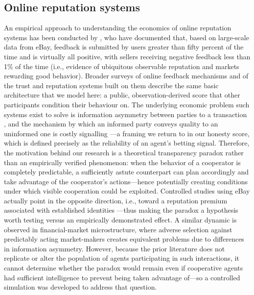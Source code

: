 \documentclass[journal]{IEEEtran}
\begin{document}
\subsection{Online reputation systems}
An empirical approach to understanding the economics of online
reputation systems has been conducted by \citet{resnick2002trust}, who have documented that, based on
large-scale data from eBay, feedback is submitted by users greater
than fifty percent of the time and is virtually all positive, with
sellers receiving negative feedback less than 1\% of the time (i.e.,
evidence of ubiquitous observable reputation and markets rewarding
good behavior). Broader surveys of online feedback mechanisms
\citep{dellarocas2003digitization} and of the trust and reputation
systems built on them \citep{josang2007survey} describe the same
basic architecture that we model here: a public, observation-derived
score that other participants condition their behaviour on. The
underlying economic problem such systems exist to solve is
information asymmetry between parties to a transaction
\citep{akerlof1970market}, and the mechanism by which an informed
party conveys quality to an uninformed one is costly signalling
\citep{spence1973job}---a framing we return to in our honesty score,
which is defined precisely as the reliability of an agent's
betting signal. Therefore, the motivation behind our research is a
theoretical transparency paradox rather than an empirically verified
phenomenon: when the behavior of a cooperator is completely
predictable, a sufficiently astute counterpart can plan accordingly
and take advantage of the cooperator's actions---hence potentially
creating conditions under which visible cooperation could be
exploited. Controlled studies using eBay actually point in the
opposite direction, i.e., toward a reputation premium associated with established identities \citep{resnick2006value}---thus making the paradox a hypothesis worth
testing versus an empirically demonstrated effect. A similar dynamic
is observed in financial-market microstructure, where adverse
selection against predictably acting market-makers
\citep{glosten1985bid} creates equivalent problems due to differences
in information asymmetry. However, because the prior literature does
not replicate or alter the population of agents participating in such
interactions, it cannot determine whether the paradox would remain
even if cooperative agents had sufficient intelligence to prevent
being taken advantage of---so a controlled simulation was developed
to address that question.
\end{document}
